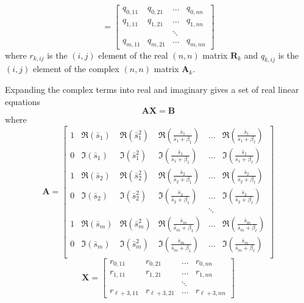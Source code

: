 \documentclass[11pt,openany,twoside]{book}
\numberwithin{equation}{section}		%
\newcommand{\Matrix}[1]{\boldsymbol{#1}}
\begin{document}
\begin{equation}
 =
\left[
\begin{array}{cccc}
q_{0,11}   & q_{0,21}   & \ldots & q_{0,nn} \\
q_{1,11}   & q_{1,21}   & \ldots & q_{1,nn} \\
           &            & \ddots &          \\
q_{m,11}   & q_{m,21}   & \ldots & q_{m,nn}
\end{array}
\right]
\end{equation}
where $r_{k,ij}$ is the $(i,j)$ element of the real $(n,n)$ matrix $\Matrix{R}_k$
and $q_{k,ij}$ is the $(i,j)$ element of the complex $(n,n)$ matrix $\Matrix{A}_k$.
\par
Expanding the complex terms into real and imaginary gives a set of real
linear equations
\begin{equation}
\Matrix{AX} = \Matrix{B}
\end{equation}
where
\begin{displaymath}
\Matrix{A} = \left[
\begin{array}{cccccc}
1 & \Re(\bar{s}_1) & \Re(\bar{s}_1^2) & \Re(\frac{\bar{s}_1}{\bar{s}_1 + \beta_1}) & \ldots & \Re(\frac{\bar{s}_1}{\bar{s}_1 + \beta_{\ell}}) \\
0 & \Im(\bar{s}_1) & \Im(\bar{s}_1^2) & \Im(\frac{\bar{s}_1}{\bar{s}_1 + \beta_1}) & \ldots & \Im(\frac{\bar{s}_1}{\bar{s}_1 + \beta_{\ell}}) \\
1 & \Re(\bar{s}_2) & \Re(\bar{s}_2^2) & \Re(\frac{\bar{s}_2}{\bar{s}_2 + \beta_1}) & \ldots & \Re(\frac{\bar{s}_2}{\bar{s}_2 + \beta_{\ell}}) \\
0 & \Im(\bar{s}_2) & \Im(\bar{s}_2^2) & \Im(\frac{\bar{s}_2}{\bar{s}_2 + \beta_1}) & \ldots & \Im(\frac{\bar{s}_2}{\bar{s}_2 + \beta_{\ell}}) \\
  &          &            &                                & \ddots &                           \\
1 & \Re(\bar{s}_m) & \Re(\bar{s}_m^2) & \Re(\frac{\bar{s}_m}{\bar{s}_m + \beta_1}) & \ldots & \Re(\frac{\bar{s}_m}{\bar{s}_m + \beta_{\ell}}) \\
0 & \Im(\bar{s}_m) & \Im(\bar{s}_m^2) & \Im(\frac{\bar{s}_m}{\bar{s}_m + \beta_1}) & \ldots & \Im(\frac{\bar{s}_m}{\bar{s}_m + \beta_{\ell}}) \\
\end{array}
\right]
\end{displaymath}
\begin{displaymath}
\Matrix{X} = \left[
\begin{array}{cccc}
r_{0,11}   & r_{0,21}   & \ldots & r_{0,nn} \\
r_{1,11}   & r_{1,21}   & \ldots & r_{1,nn} \\
           &            & \ddots &          \\
r_{\ell+3,11} & r_{\ell+3,21} & \ldots & r_{\ell+3,nn}
\end{array}
\right]
\end{displaymath}
\end{document}
